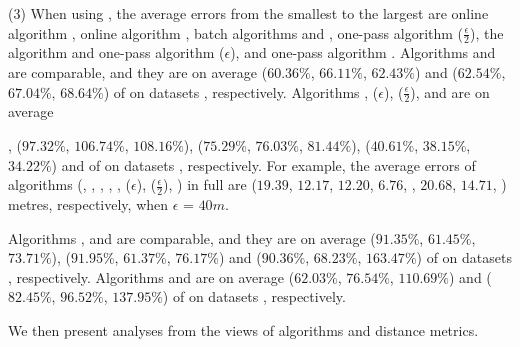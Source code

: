 \sstab (3) When using \sed, the average errors from the smallest
to the largest are online algorithm {\dagots}, online algorithm \squishe, batch algorithms \tpa and \dpa,
one-pass algorithm \cised($\frac{\epsilon}{2}$),  the \opt algorithm and one-pass algorithm \cised(${\epsilon}$), and one-pass algorithm .
%
Algorithms \tpa and \dpa are comparable, and they are on average
{($60.36\%$, $66.11\%$, $62.43\%$) and ($62.54\%$, $67.04\%$, $68.64\%$)} of \opt on datasets \dSets, respectively.
Algorithms , \cised(${\epsilon}$), \cised($\frac{\epsilon}{2}$), \squishe and {\dagots} are on average {, ($97.32\%$, $106.74\%$, $108.16\%$), ($75.29\%$, $76.03\%$, $81.44\%$), ($40.61\%$, $38.15\%$, $34.22\%$) and  of \opt on datasets \dSets, respectively.
%
For example, the average errors of algorithms
(\opt, \tpa, \dpa, \squishe, \myblue{\dagots}, \cised(${\epsilon}$), \cised($\frac{\epsilon}{2}$),  ) in full \mopsi are ($19.39$, $12.17$, $12.20$,  $6.76$, , $20.68$, $14.71$,  ) metres, respectively, when $\epsilon$ = $40m$.
%


Algorithms \tpa, \opwa and \interval are comparable, and they are on average
{($91.35\%$, $61.45\%$, $73.71\%$), ($91.95\%$, $61.37\%$, $76.17\%$) and ($90.36\%$, $68.23\%$, $163.47\%$)} of \opt on datasets \dSets, respectively.
Algorithms \intersec and \dpa are on average ($62.03\%$, $76.54\%$, $110.69\%$) and ($82.45\%$, $96.52\%$, $137.95\%$) of \opt on datasets \dSets, respectively.




We then present analyses from the views of \lsa algorithms and distance metrics.


}
